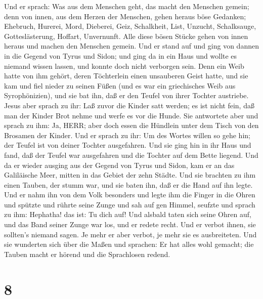  Und er sprach: Was aus dem Menschen geht, das macht den
Menschen gemein;  denn von innen, aus dem Herzen der
Menschen, gehen heraus böse Gedanken; Ehebruch, Hurerei, Mord,
 Dieberei, Geiz, Schalkheit, List, Unzucht, Schalksauge,
Gotteslästerung, Hoffart, Unvernunft.  Alle diese bösen
Stücke gehen von innen heraus und machen den Menschen gemein.
 Und er stand auf und ging von dannen in die Gegend von
Tyrus und Sidon; und ging da in ein Haus und wollte es niemand wissen
lassen, und konnte doch nicht verborgen sein.  Denn ein
Weib hatte von ihm gehört, deren Töchterlein einen unsauberen Geist
hatte, und sie kam und fiel nieder zu seinen Füßen  (und es
war ein griechisches Weib aus Syrophönizien), und sie bat ihn, daß er
den Teufel von ihrer Tochter austriebe.  Jesus aber sprach
zu ihr: Laß zuvor die Kinder satt werden; es ist nicht fein, daß man der
Kinder Brot nehme und werfe es vor die Hunde.  Sie
antwortete aber und sprach zu ihm: Ja, HERR; aber doch essen die
Hündlein unter dem Tisch von den Brosamen der Kinder.  Und
er sprach zu ihr: Um des Wortes willen so gehe hin; der Teufel ist von
deiner Tochter ausgefahren.  Und sie ging hin in ihr Haus
und fand, daß der Teufel war ausgefahren und die Tochter auf dem Bette
liegend.  Und da er wieder ausging aus der Gegend von Tyrus
und Sidon, kam er an das Galiläische Meer, mitten in das Gebiet der zehn
Städte.  Und sie brachten zu ihm einen Tauben, der stumm
war, und sie baten ihn, daß er die Hand auf ihn legte.  Und
er nahm ihn von dem Volk besonders und legte ihm die Finger in die Ohren
und spützte und rührte seine Zunge  und sah auf gen Himmel,
seufzte und sprach zu ihm: Hephatha! das ist: Tu dich auf! 
Und alsbald taten sich seine Ohren auf, und das Band seiner Zunge war
los, und er redete recht.  Und er verbot ihnen, sie
sollten's niemand sagen. Je mehr er aber verbot, je mehr sie es
ausbreiteten.  Und sie wunderten sich über die Maßen und
sprachen: Er hat alles wohl gemacht; die Tauben macht er hörend und die
Sprachlosen redend.

\hypertarget{section-7}{%
\section{8}\label{section-7}}

